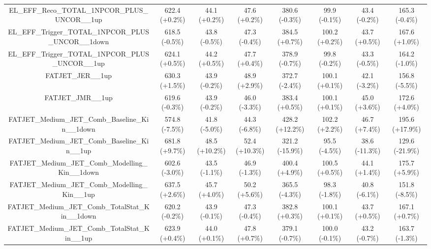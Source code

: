 \begin{table}[htbp!]
\begin{tiny}
\begin{center}
\begin{tabular}{c|c|c|c||c|c|c|c}
EL\_EFF\_Reco\_TOTAL\_1NPCOR\_PLUS\_UNCOR\_\_1up             & 622.4     (+0.2\%) & 44.1      (+0.2\%) & 47.6      (+0.2\%) & 380.6     (-0.3\%) & 99.9      (-0.1\%) & 43.4      (-0.2\%) & 165.3     (-0.4\%) \\ 
EL\_EFF\_Trigger\_TOTAL\_1NPCOR\_PLUS\_UNCOR\_\_1down        & 618.5     (-0.5\%) & 43.8      (-0.5\%) & 47.3      (-0.4\%) & 384.5     (+0.7\%) & 100.2     (+0.2\%) & 43.7      (+0.5\%) & 167.6     (+1.0\%) \\ 
EL\_EFF\_Trigger\_TOTAL\_1NPCOR\_PLUS\_UNCOR\_\_1up          & 624.1     (+0.5\%) & 44.2      (+0.5\%) & 47.7      (+0.4\%) & 378.9     (-0.7\%) & 99.8      (-0.2\%) & 43.3      (-0.5\%) & 164.2     (-1.0\%) \\ 
FATJET\_JER\_\_1up                                           & 630.3     (+1.5\%) & 43.9      (-0.2\%) & 48.9      (+2.9\%) & 372.7     (-2.4\%) & 100.1     (+0.1\%) & 42.1      (-3.2\%) & 156.8     (-5.5\%) \\ 
FATJET\_JMR\_\_1up                                           & 619.6     (-0.3\%) & 43.9      (-0.2\%) & 46.0      (-3.3\%) & 383.4     (+0.5\%) & 100.1     (+0.1\%) & 45.0      (+3.6\%) & 172.6     (+4.0\%) \\ 
FATJET\_Medium\_JET\_Comb\_Baseline\_Kin\_\_1down            & 574.8     (-7.5\%) & 41.8      (-5.0\%) & 44.3      (-6.8\%) & 428.2     (+12.2\%) & 102.2     (+2.2\%) & 46.7      (+7.4\%) & 195.6     (+17.9\%) \\ 
FATJET\_Medium\_JET\_Comb\_Baseline\_Kin\_\_1up              & 681.8     (+9.7\%) & 48.5      (+10.2\%) & 52.4      (+10.3\%) & 321.2     (-15.9\%) & 95.5      (-4.5\%) & 38.6      (-11.3\%) & 129.6     (-21.9\%) \\ 
FATJET\_Medium\_JET\_Comb\_Modelling\_Kin\_\_1down           & 602.6     (-3.0\%) & 43.5      (-1.1\%) & 46.9      (-1.3\%) & 400.4     (+4.9\%) & 100.5     (+0.5\%) & 44.1      (+1.4\%) & 175.7     (+5.9\%) \\ 
FATJET\_Medium\_JET\_Comb\_Modelling\_Kin\_\_1up             & 637.5     (+2.6\%) & 45.7      (+4.0\%) & 50.2      (+5.6\%) & 365.5     (-4.3\%) & 98.3      (-1.8\%) & 40.8      (-6.1\%) & 151.8     (-8.5\%) \\ 
FATJET\_Medium\_JET\_Comb\_TotalStat\_Kin\_\_1down           & 620.2     (-0.2\%) & 43.9      (-0.1\%) & 47.3      (-0.4\%) & 382.8     (+0.3\%) & 100.1     (+0.1\%) & 43.7      (+0.5\%) & 167.1     (+0.7\%) \\ 
FATJET\_Medium\_JET\_Comb\_TotalStat\_Kin\_\_1up             & 623.9     (+0.4\%) & 44.0      (+0.1\%) & 47.8      (+0.7\%) & 379.1     (-0.7\%) & 100.0     (-0.1\%) & 43.2      (-0.7\%) & 163.7     (-1.3\%) \\ 

\end{tabular}
\end{center}
\end{tiny}
\end{table}

